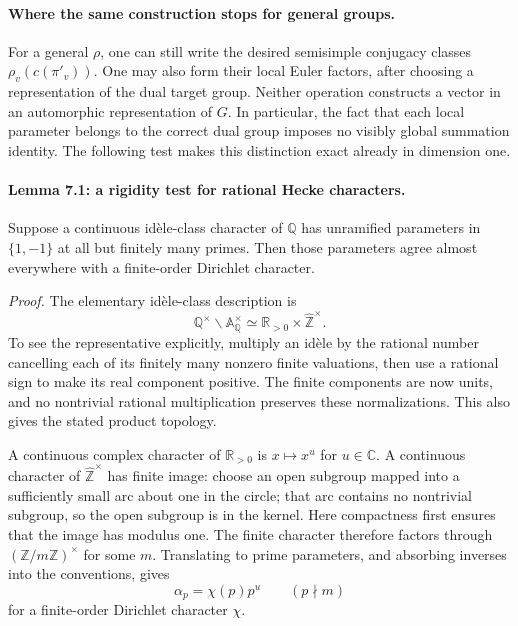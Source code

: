 \documentclass[11pt]{article}
\begin{document}
\paragraph{Where the same construction stops for general groups.}
For a general $\rho$, one can still write the desired semisimple
conjugacy classes $\rho_v(c(\pi'_v))$. One may also form their local
Euler factors, after choosing a representation of the dual target
group. Neither operation constructs a vector in an automorphic
representation of $G$. In particular, the fact that each local
parameter belongs to the correct dual group imposes no visibly global
summation identity. The following test makes this distinction exact
already in dimension one.

\paragraph{Lemma 7.1: a rigidity test for rational Hecke characters.}
Suppose a continuous id\`ele-class character of $\mathbb Q$ has
unramified parameters in $\{1,-1\}$ at all but finitely many primes.
Then those parameters agree almost everywhere with a finite-order
Dirichlet character.

\emph{Proof.} The elementary id\`ele-class description is
\[
 \mathbb Q^\times\backslash\mathbb A_{\mathbb Q}^\times
           \simeq\mathbb R_{>0}\times\widehat{\mathbb Z}^{\times}.
\]
To see the representative explicitly, multiply an id\`ele by the
rational number cancelling each of its finitely many nonzero finite
valuations, then use a rational sign to make its real component
positive. The finite components are now units, and no nontrivial
rational multiplication preserves these normalizations. This also
gives the stated product topology.

A continuous complex character of $\mathbb R_{>0}$ is $x\mapsto x^u$
for $u\in\mathbb C$. A continuous character of
$\widehat{\mathbb Z}^{\times}$ has finite image: choose an open subgroup
mapped into a sufficiently small arc about one in the circle; that arc
contains no nontrivial subgroup, so the open subgroup is in the kernel.
Here compactness first ensures that the image has modulus one.
The finite character therefore factors through
$(\mathbb Z/m\mathbb Z)^\times$ for some $m$. Translating to prime
parameters, and absorbing inverses into the conventions, gives
\begin{equation}\label{cont7:hecke}
 \alpha_p=\chi(p)p^u\qquad(p\nmid m)
\end{equation}
for a finite-order Dirichlet character $\chi$.
\end{document}
